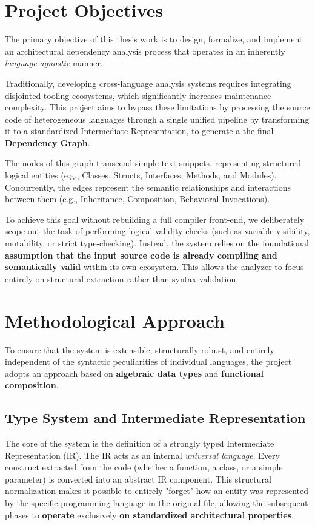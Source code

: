 \section{Project Objectives}
The primary objective of this thesis work is to design, formalize,
and implement an architectural dependency analysis process that
operates in an inherently \textit{language-agnostic} manner.

Traditionally, developing cross-language analysis systems requires
integrating disjointed tooling ecosystems, which significantly
increases maintenance complexity. This project aims to bypass these
limitations by processing the source code of heterogeneous
languages through a single unified pipeline by transforming it to a
standardized Intermediate Representation, to generate a
the final \textbf{Dependency Graph}.

The nodes of this graph transcend simple text snippets, representing
structured logical entities (e.g., Classes, Structs, Interfaces,
Methods, and Modules). Concurrently, the edges represent the semantic
relationships and interactions between them (e.g., Inheritance,
Composition, Behavioral Invocations).

To achieve this goal without rebuilding a full compiler front-end, we
deliberately scope out the task of performing logical validity checks
(such as variable visibility, mutability, or strict type-checking).
Instead, the system relies on the foundational \textbf{assumption
  that the input source code is already compiling and semantically
valid} within its own ecosystem. This allows the analyzer to focus
entirely on structural extraction rather than syntax validation.

\section{Methodological Approach}
To ensure that the system is extensible, structurally robust, and
entirely independent of the syntactic peculiarities of individual
languages, the project adopts an approach based on
\textbf{algebraic data types} \cite{pierce_types_2002} and
\textbf{functional composition}.

\subsection{Type System and Intermediate Representation}
The core of the system is the definition of a strongly typed
Intermediate Representation (IR). The IR acts as an internal
\textit{universal language}. Every construct extracted from the
code (whether a function, a class, or a simple parameter) is converted
into an abstract IR component. This structural normalization makes it
possible to entirely "forget" how an entity was represented by the
specific programming language in the original file, allowing the
subsequent phases to \textbf{operate} exclusively \textbf{on standardized
architectural properties}.

